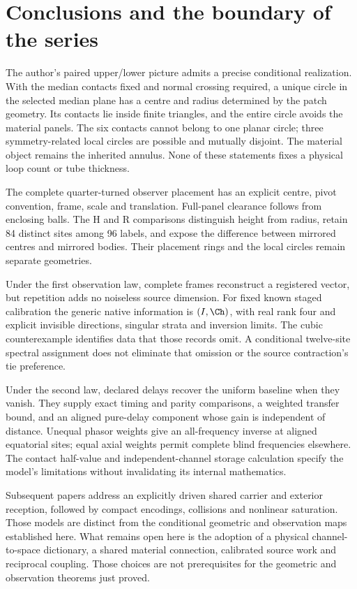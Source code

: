 \section{Conclusions and the boundary of the series}\label{sec:conclusions}
The author's paired upper/lower picture admits a precise conditional realization. With the median contacts fixed and normal crossing required, a unique circle in the selected median plane has a centre and radius determined by the patch geometry. Its contacts lie inside finite triangles, and the entire circle avoids the material panels. The six contacts cannot belong to one planar circle; three symmetry-related local circles are possible and mutually disjoint. The material object remains the inherited annulus. None of these statements fixes a physical loop count or tube thickness.

The complete quarter-turned observer placement has an explicit centre, pivot convention, frame, scale and translation. Full-panel clearance follows from enclosing balls. The H and R comparisons distinguish height from radius, retain 84 distinct sites among 96 labels, and expose the difference between mirrored centres and mirrored bodies. Their placement rings and the local circles remain separate geometries.

Under the first observation law, complete frames reconstruct a registered vector, but repetition adds no noiseless source dimension. For fixed known staged calibration the generic native information is $(I,\Ch)$, with real rank four and explicit invisible directions, singular strata and inversion limits. The cubic counterexample identifies data that those records omit. A conditional twelve-site spectral assignment does not eliminate that omission or the source contraction's tie preference.

Under the second law, declared delays recover the uniform baseline when they vanish. They supply exact timing and parity comparisons, a weighted transfer bound, and an aligned pure-delay component whose gain is independent of distance. Unequal phasor weights give an all-frequency inverse at aligned equatorial sites; equal axial weights permit complete blind frequencies elsewhere. The contact half-value and independent-channel storage calculation specify the model's limitations without invalidating its internal mathematics.

Subsequent papers address an explicitly driven shared carrier and exterior reception, followed by compact encodings, collisions and nonlinear saturation. Those models are distinct from the conditional geometric and observation maps established here. What remains open here is the adoption of a physical channel-to-space dictionary, a shared material connection, calibrated source work and reciprocal coupling. Those choices are not prerequisites for the geometric and observation theorems just proved.

